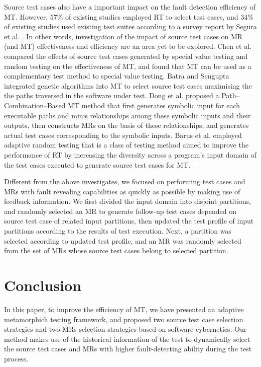\documentclass[10pt,journal,compsoc]{IEEEtran}
\begin{document}
Source test cases also have a important impact on the fault detection efficiency of MT. However, 57\% of existing studies employed RT to select test cases, and 34\% of existing studies used existing test suites according to a survey report by Segura et al. \cite{segura2016survey}. In other words, investigation of the impact of source test cases on MR (and MT) effectiveness and efficiency are an area yet to be explored. 
Chen et al. \cite{chen2004metamorphic} compared the effects of source test cases generated by special value testing and random testing on the effectiveness of MT, and found that MT can be used as a complementary test method to special value testing.
Batra and  Sengupta \cite{batra2011efficient} integrated genetic algorithms into MT to select source test cases maximising the the paths traversed in the software under test.
Dong et al. \cite{dong2013security} proposed a Path--Combination--Based MT method that first generates symbolic input for each executable paths and minis relationships among these symbolic inputs and their outputs, then constructs MRs on the basis of these relationships, and generates actual test cases corresponding to the symbolic inputs.
Barus et al. \cite{barus2016impact} employed adaptive random testing \cite{chen2004adaptive} that is a class of testing method aimed to improve the performance of RT by increasing the diversity across a program's input domain of the test cases executed to generate source test cases for MT.

Different from the above investigates, we focused on performing test cases and MRs with fault revealing capabilities as quickly as possible by making use of feedback information. We first divided the input domain into disjoint partitions, and randomly selected an MR to generate follow-up test cases depended on source test case of related input partitions, then updated the test profile of input partitions according to the results of test execution. Next, a partition was selected according to updated test profile, and an MR was randomly selected from the set of MRs whose source test cases belong to selected partition.

\section{Conclusion}
\label{sec:conclusion}
In this paper, to improve the efficiency of MT, we have presented an adaptive metamorphich testing framework, and proposed two source test case selection strategies and two MRs selection strategies based on software cybernetics. Our method makes use of the historical information of the test to dynamically select the source test cases and MRs with higher fault-detecting ability during the test process.
\end{document}
